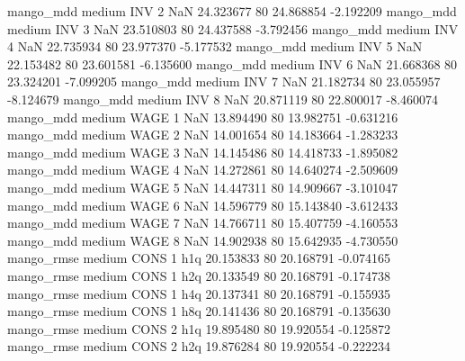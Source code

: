         mango_mdd     medium      INV                 2                  NaN 24.323677 80      24.868854          -2.192209
        mango_mdd     medium      INV                 3                  NaN 23.510803 80      24.437588          -3.792456
        mango_mdd     medium      INV                 4                  NaN 22.735934 80      23.977370          -5.177532
        mango_mdd     medium      INV                 5                  NaN 22.153482 80      23.601581          -6.135600
        mango_mdd     medium      INV                 6                  NaN 21.668368 80      23.324201          -7.099205
        mango_mdd     medium      INV                 7                  NaN 21.182734 80      23.055957          -8.124679
        mango_mdd     medium      INV                 8                  NaN 20.871119 80      22.800017          -8.460074
        mango_mdd     medium     WAGE                 1                  NaN 13.894490 80      13.982751          -0.631216
        mango_mdd     medium     WAGE                 2                  NaN 14.001654 80      14.183664          -1.283233
        mango_mdd     medium     WAGE                 3                  NaN 14.145486 80      14.418733          -1.895082
        mango_mdd     medium     WAGE                 4                  NaN 14.272861 80      14.640274          -2.509609
        mango_mdd     medium     WAGE                 5                  NaN 14.447311 80      14.909667          -3.101047
        mango_mdd     medium     WAGE                 6                  NaN 14.596779 80      15.143840          -3.612433
        mango_mdd     medium     WAGE                 7                  NaN 14.766711 80      15.407759          -4.160553
        mango_mdd     medium     WAGE                 8                  NaN 14.902938 80      15.642935          -4.730550
       mango_rmse     medium     CONS                 1                  h1q 20.153833 80      20.168791          -0.074165
       mango_rmse     medium     CONS                 1                  h2q 20.133549 80      20.168791          -0.174738
       mango_rmse     medium     CONS                 1                  h4q 20.137341 80      20.168791          -0.155935
       mango_rmse     medium     CONS                 1                  h8q 20.141436 80      20.168791          -0.135630
       mango_rmse     medium     CONS                 2                  h1q 19.895480 80      19.920554          -0.125872
       mango_rmse     medium     CONS                 2                  h2q 19.876284 80      19.920554          -0.222234
